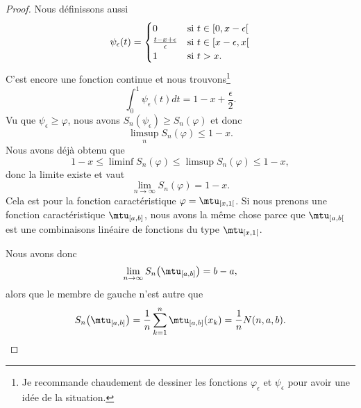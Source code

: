 \begin{proof}
    Nous définissons aussi
    \begin{equation}
        \psi_{\epsilon}(t)=\begin{cases}
            0    &   \text{si \( t\in \mathopen[ 0 , x-\epsilon [\)}\\
            \frac{ t-x+\epsilon }{ \epsilon }    &   \text{si \( t\in\mathopen[ x-\epsilon , x [\)}\\
            1    &    \text{si \( t>x\)}.
        \end{cases}
    \end{equation}
    C'est encore une fonction continue et nous trouvons\footnote{Je recommande chaudement de dessiner les fonctions \( \varphi_{\epsilon}\) et \( \psi_{\epsilon}\) pour avoir une idée de la situation.}
    \begin{equation}
        \int_0^1\psi_{\epsilon}(t)dt=1-x+\frac{ \epsilon }{2}.
    \end{equation}
    Vu que \( \psi_{\epsilon}\geq\varphi\), nous avons \( S_n(\psi_{\epsilon})\geq S_n(\varphi)\) et donc
    \begin{equation}
        \limsup_{n}S_n(\varphi)\leq 1-x.
    \end{equation}
    Nous avons déjà obtenu que
    \begin{equation}
        1-x\leq\liminf S_n(\varphi)\leq \limsup S_n(\varphi)\leq 1-x,
    \end{equation}
    donc la limite existe et vaut
    \begin{equation}
        \lim_{n\to \infty} S_n(\varphi)=1-x.
    \end{equation}
    Cela est pour la fonction caractéristique \( \varphi=\mtu_{\mathopen[ x , 1 [}\). Si nous prenons une fonction caractéristique \( \mtu_{\mathopen[ a , b \mathclose]}\), nous avons la même chose parce que \( \mtu_{\mathopen[ a , b [}\) est une combinaisons linéaire de fonctions du type \( \mtu_{\mathopen[ x , 1 [}\).

    Nous avons donc
    \begin{equation}
        \lim_{n\to \infty} S_n\big( \mtu_{\mathopen[ a , b \mathclose]} \big)=b-a,
    \end{equation}
    alors que le membre de gauche n'est autre que
    \begin{equation}
        S_n\big( \mtu_{\mathopen[ a , b \mathclose]} \big)=\frac{1}{ n }\sum_{k=1}^n\mtu_{\mathopen[ a , b \mathclose]}(x_k)=\frac{1}{ n }N(n,a,b).
    \end{equation}
\end{proof}

